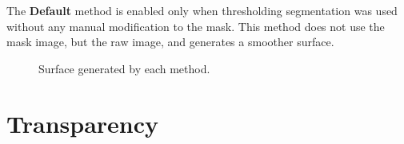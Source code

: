 The \textbf{Default} method is enabled only when thresholding segmentation was used without any manual modification to the mask. This method does not use the mask image, but the raw image, and generates a smoother surface.

\begin{figure}[!htb]
  \centering
  \hfill
  \hfill
  \caption{Surface generated by each method.}
  \label{fig:surf_method}
\end{figure}

\section{Transparency}

